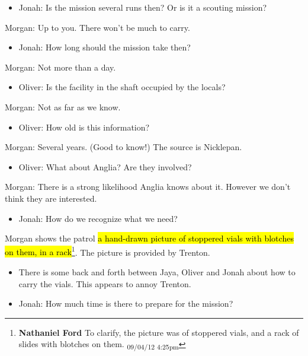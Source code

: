 \begin{itemize}
\item Jonah: Is the mission several runs then?  Or is it a scouting mission?
\end{itemize}

Morgan: Up to you.  There won't be much to carry.

\begin{itemize}
\item Jonah: How long should the mission take then?
\end{itemize}

Morgan: Not more than a day.

\begin{itemize}
\item Oliver: Is the facility in the shaft occupied by the locals?
\end{itemize}

Morgan: Not as far as we know.

\begin{itemize}
\item Oliver: How old is this information?
\end{itemize}

Morgan: Several years.  (Good to know!)  The source is Nicklepan.

\begin{itemize}
\item Oliver: What about Anglia?  Are they involved?
\end{itemize}

Morgan: There is a strong likelihood Anglia knows about it.  However we don't think they are interested.

\begin{itemize}
\item Jonah: How do we recognize what we need?
\end{itemize}

Morgan shows the patrol \hl{a hand-drawn picture of stoppered vials with blotches on them, in a rack}\footnote{\textbf{Nathaniel Ford }To clarify, the picture was of stoppered vials, and a rack of slides with blotches on them. \textsubscript{09/04/12 4:25pm}}.  The picture is provided by Trenton.

\begin{itemize}
\item There is some back and forth between Jaya, Oliver and Jonah about how to carry the vials.  This appears to annoy Trenton.
\item Jonah:  How much time is there to prepare for the mission?
\end{itemize}

